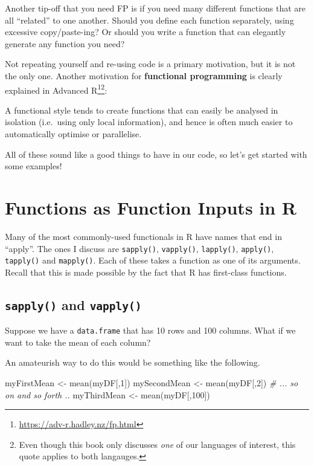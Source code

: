 \documentclass[
  12pt,
  krantz2]{krantz}
\makeatletter
\newenvironment{Shaded}{\begin{snugshade}}{\end{snugshade}}
\newcommand{\CommentTok}[1]{\textcolor[rgb]{0.37,0.37,0.37}{\textit{#1}}}
\newcommand{\DecValTok}[1]{\textcolor[rgb]{0.06,0.06,0.06}{#1}}
\newcommand{\FunctionTok}[1]{\textcolor[rgb]{0,0,0}{#1}}
\newcommand{\NormalTok}[1]{#1}
\newcommand{\OtherTok}[1]{\textcolor[rgb]{0.37,0.37,0.37}{#1}}
\renewenvironment{quote}{\begin{VF}}{\end{VF}}
\renewcommand{\href}[2]{#2\footnote{\url{#1}}}
\newenvironment{kframe}{%
\medskip{}
\setlength{\fboxsep}{.8em}
 \def\at@end@of@kframe{}%
 \ifinner\ifhmode%
  \def\at@end@of@kframe{\end{minipage}}%
  \begin{minipage}{\columnwidth}%
 \fi\fi%
 \def\FrameCommand##1{\hskip\@totalleftmargin \hskip-\fboxsep
 \colorbox{shadecolor}{##1}\hskip-\fboxsep
     \hskip-\linewidth \hskip-\@totalleftmargin \hskip\columnwidth}%
 \MakeFramed {\advance\hsize-\width
   \@totalleftmargin\z@ \linewidth\hsize
   \@setminipage}}%
 {\par\unskip\endMakeFramed%
 \at@end@of@kframe}
\renewenvironment{Shaded}{\begin{kframe}}{\end{kframe}}
\makeatother
\begin{document}
Another tip-off that you need FP is if you need many different functions that are all ``related'' to one another. Should you define each function separately, using excessive copy/paste-ing? Or should you write a function that can elegantly generate any function you need?

Not repeating yourself and re-using code is a primary motivation, but it is not the only one. Another motivation for \textbf{functional programming} is clearly explained in \href{https://adv-r.hadley.nz/fp.html}{Advanced R}\footnote{Even though this book only discusses \emph{one} of our languages of interest, this quote applies to both langauges.}:

\begin{quote}
A functional style tends to create functions that can easily be analysed in isolation (i.e.~using only local information), and hence is often much easier to automatically optimise or parallelise.
\end{quote}

All of these sound like a good things to have in our code, so let's get started with some examples!

\hypertarget{functions-as-function-inputs-in-r}{%
\section{Functions as Function Inputs in R}\label{functions-as-function-inputs-in-r}}

Many of the most commonly-used functionals in R have names that end in ``apply''. The ones I discuss are \texttt{sapply()}, \texttt{vapply()}, \texttt{lapply()}, \texttt{apply()}, \texttt{tapply()} and \texttt{mapply()}. Each of these takes a function as one of its arguments. Recall that this is made possible by the fact that R has first-class functions.

\hypertarget{sapply-and-vapply}{%
\subsection{\texorpdfstring{\texttt{sapply()} and \texttt{vapply()}}{sapply() and vapply()}}\label{sapply-and-vapply}}

Suppose we have a \texttt{data.frame} that has 10 rows and 100 columns. What if we want to take the mean of each column?

An amateurish way to do this would be something like the following.

\begin{Shaded}
\begin{Highlighting}[]
\NormalTok{myFirstMean }\OtherTok{\textless{}{-}} \FunctionTok{mean}\NormalTok{(myDF[,}\DecValTok{1}\NormalTok{])}
\NormalTok{mySecondMean }\OtherTok{\textless{}{-}} \FunctionTok{mean}\NormalTok{(myDF[,}\DecValTok{2}\NormalTok{])}
\CommentTok{\# ... so on and so forth ..}
\NormalTok{myThirdMean }\OtherTok{\textless{}{-}} \FunctionTok{mean}\NormalTok{(myDF[,}\DecValTok{100}\NormalTok{])}
\end{Highlighting}
\end{Shaded}
\end{document}
